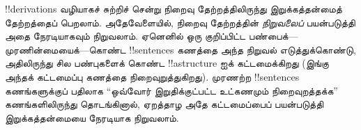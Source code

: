 \documentclass[../../../include/open-logic-section]{subfiles}
\begin{document}
!!{derivation}s வழியாகச் சுற்றிச் சென்று நிறைவு தேற்றத்திலிருந்து
இறுக்கத்தன்மைத் தேற்றத்தைப் பெறலாம். அதேவேளையில், நிறைவு தேற்றத்தின்
\emph{நிறுவலைப்} பயன்படுத்தி அதை நேரடியாகவும் நிறுவலாம். ஏனெனில் ஒரு
குறிப்பிட்ட பண்பைக்---முரணின்மையைக்---கொண்ட !!{sentence}s கணத்தை அந்த
நிறுவல் எடுத்துக்கொண்டு, அதிலிருந்து சில பண்புகளைக் கொண்ட !!a{structure}
ஐக் கட்டமைக்கிறது (இங்கு அந்தக் கட்டமைப்பு கணத்தை நிறைவுறுத்துகிறது).
முரணற்ற !!{sentence}s கணங்களுக்குப் பதிலாக ``ஒவ்வோர் இறுதிக்குட்பட்ட
உட்கணமும் நிறைவுறத்தக்க'' கணங்களிலிருந்து தொடங்கினால், ஏறத்தாழ அதே
கட்டமைப்பைப் பயன்படுத்தி இறுக்கத்தன்மையை நேரடியாக நிறுவலாம்.
\end{document}
